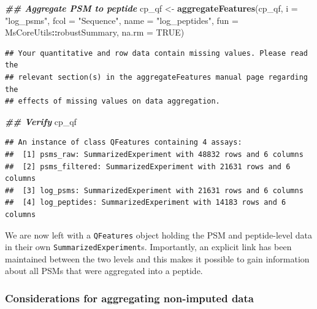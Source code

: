 \documentclass[9pt,a4paper,]{extarticle}
\newenvironment{Shaded}{\begin{snugshade}}{\end{snugshade}}
\newcommand{\AttributeTok}[1]{\textcolor[rgb]{0.13,0.29,0.53}{#1}}
\newcommand{\ConstantTok}[1]{\textcolor[rgb]{0.56,0.35,0.01}{#1}}
\newcommand{\DocumentationTok}[1]{\textcolor[rgb]{0.56,0.35,0.01}{\textbf{\textit{#1}}}}
\newcommand{\FunctionTok}[1]{\textcolor[rgb]{0.13,0.29,0.53}{\textbf{#1}}}
\newcommand{\NormalTok}[1]{#1}
\newcommand{\OtherTok}[1]{\textcolor[rgb]{0.56,0.35,0.01}{#1}}
\newcommand{\SpecialCharTok}[1]{\textcolor[rgb]{0.81,0.36,0.00}{\textbf{#1}}}
\newcommand{\StringTok}[1]{\textcolor[rgb]{0.31,0.60,0.02}{#1}}
\begin{document}
\begin{Shaded}
\begin{Highlighting}[]
\DocumentationTok{\#\# Aggregate PSM to peptide}
\NormalTok{cp\_qf }\OtherTok{\textless{}{-}} \FunctionTok{aggregateFeatures}\NormalTok{(cp\_qf,}
                           \AttributeTok{i =} \StringTok{"log\_psms"}\NormalTok{,}
                           \AttributeTok{fcol =} \StringTok{"Sequence"}\NormalTok{,}
                           \AttributeTok{name =} \StringTok{"log\_peptides"}\NormalTok{,}
                           \AttributeTok{fun =}\NormalTok{ MsCoreUtils}\SpecialCharTok{::}\NormalTok{robustSummary,}
                           \AttributeTok{na.rm =} \ConstantTok{TRUE}\NormalTok{)}
\end{Highlighting}
\end{Shaded}

\begin{verbatim}
## Your quantitative and row data contain missing values. Please read the
## relevant section(s) in the aggregateFeatures manual page regarding the
## effects of missing values on data aggregation.
\end{verbatim}

\begin{Shaded}
\begin{Highlighting}[]
\DocumentationTok{\#\# Verify}
\NormalTok{cp\_qf}
\end{Highlighting}
\end{Shaded}

\begin{verbatim}
## An instance of class QFeatures containing 4 assays:
##  [1] psms_raw: SummarizedExperiment with 48832 rows and 6 columns 
##  [2] psms_filtered: SummarizedExperiment with 21631 rows and 6 columns 
##  [3] log_psms: SummarizedExperiment with 21631 rows and 6 columns 
##  [4] log_peptides: SummarizedExperiment with 14183 rows and 6 columns
\end{verbatim}

We are now left with a \texttt{QFeatures} object holding the PSM and peptide-level data
in their own \texttt{SummarizedExperiment}s. Importantly, an explicit link has been
maintained between the two levels and this makes it possible to gain information
about all PSMs that were aggregated into a peptide.

\subsubsection{Considerations for aggregating non-imputed data}\label{considerations-for-aggregating-non-imputed-data}
\end{document}
